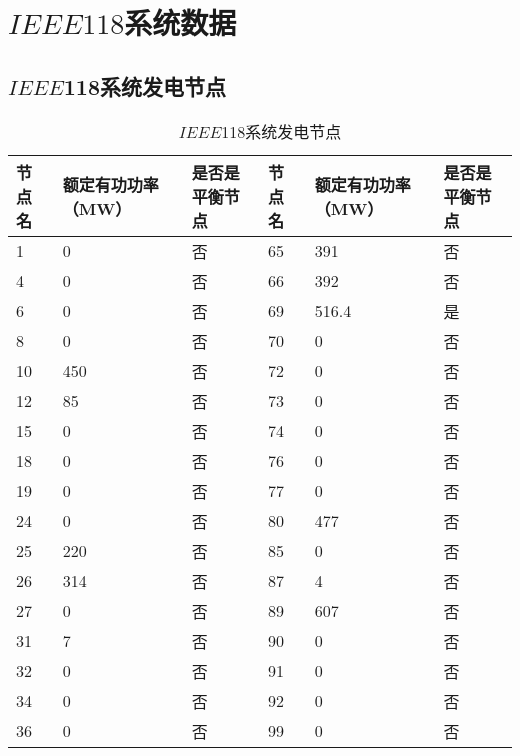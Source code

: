 \chapter{$IEEE118$系统数据}
\label{cha:engorg}

\section{$IEEE$118系统发电节点}
\label{sec:lp}

\begin{table}[H]
\centering
\caption{$IEEE$118系统发电节点}
\label{tab:chap5:generator118}
\begin{tabular}{C{1.4cm}C{2.4cm}C{2.2cm}C{1.4cm}C{2.4cm}C{2.2cm}}
\toprule
\textbf{节点名} & \textbf{额定有功功率（MW）} & \textbf{ 是否是平衡节点 } & \textbf{节点名} & \textbf{额定有功功率（MW）}  & \textbf{ 是否是平衡节点 } \\
   & 0          & 否       & 65  & 391        & 否       \\
4   & 0          & 否       & 66  & 392        & 否       \\
6   & 0          & 否       & 69  & 516.4      & 是       \\
8   & 0          & 否       & 70  & 0          & 否       \\
10  & 450        & 否       & 72  & 0          & 否       \\
12  & 85         & 否       & 73  & 0          & 否       \\
15  & 0          & 否       & 74  & 0          & 否       \\
18  & 0          & 否       & 76  & 0          & 否       \\
19  & 0          & 否       & 77  & 0          & 否       \\
24  & 0          & 否       & 80  & 477        & 否       \\
25  & 220        & 否       & 85  & 0          & 否       \\
26  & 314        & 否       & 87  & 4          & 否       \\
27  & 0          & 否       & 89  & 607        & 否       \\
31  & 7          & 否       & 90  & 0          & 否       \\
32  & 0          & 否       & 91  & 0          & 否       \\
34  & 0          & 否       & 92  & 0          & 否       \\
36  & 0          & 否       & 99  & 0          & 否       \\

\end{tabular}
\end{table}
